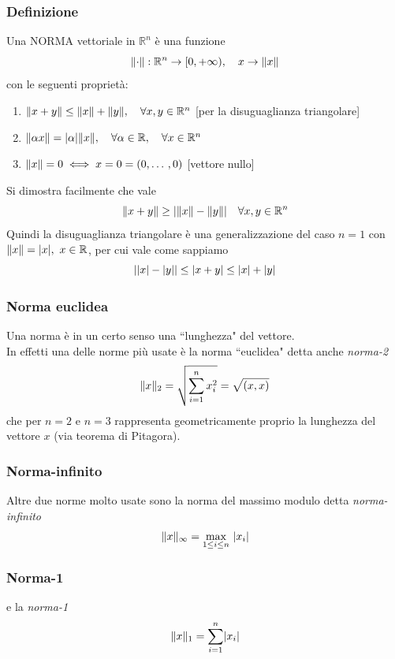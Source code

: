 \subsubsection{Definizione}
Una NORMA vettoriale in $\mathbb{R}^n$ è una funzione
\[
\lVert\cdot\rVert : \mathbb{R}^n \to [ 0, + \infty ), \quad x \to \lVert x\rVert
\]
con le seguenti proprietà:
\begin{enumerate}
    \item $\lVert x+y\rVert \le \lVert x\rVert + \lVert y\rVert, \quad \forall x,y \in \mathbb{R}^n$ [per la disuguaglianza triangolare]
    
    \item $\lVert\alpha x\rVert = \lvert\alpha\rvert \lVert x\rVert, \quad \forall \alpha \in \mathbb{R}, \quad \forall x \in \mathbb{R}^n$
    
    \item $\lVert x\rVert = 0 \iff x = 0 = (0, \dotso , 0)$ [vettore nullo]
\end{enumerate}
Si dimostra facilmente che vale
\[
\lVert x+y\rVert \ge \lvert\lVert x\rVert - \lVert y\rVert\rvert \quad \forall x, y \in \mathbb{R}^n
\]
Quindi la disuguaglianza triangolare è una generalizzazione del caso $n=1$ con $\lVert x\rVert = \lvert x\rvert, \ x \in \mathbb{R}$, per cui vale come sappiamo
\[
\lvert\lvert x\rvert - \lvert y\rvert\rvert \le \lvert x+y\rvert \le \lvert x\rvert + \lvert y\rvert
\]

\subsubsection{Norma euclidea}
Una norma è in un certo senso una ``lunghezza" del vettore.\\
In effetti una delle norme più usate è la norma ``euclidea" detta anche \textit{norma-2}
\[
\lVert x\rVert_2 = \sqrt{\sum_{i=1}^n x_i^2} = \sqrt{(x,x)}
\]
che per $n=2$ e $n=3$ rappresenta geometricamente proprio la lunghezza del vettore $x$ (via teorema di Pitagora).\\

\subsubsection{Norma-infinito}
Altre due norme molto usate sono la norma del massimo modulo detta \textit{norma-infinito}
\[
\lVert x\rVert_\infty = \underset{1 \le i \le n}{\text{max}} \ \lvert x_i\rvert
\]

\subsubsection{Norma-1}
e la \textit{norma-1}
\[
\lVert x\rVert_1 = \sum_{i=1}^n \lvert x_i\rvert
\]

